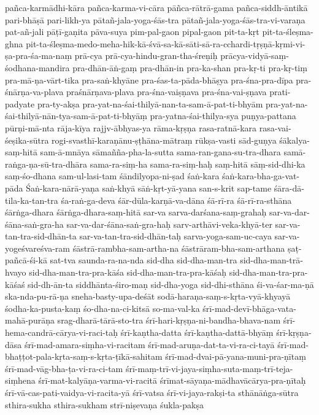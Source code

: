{{pañca-karmādhi-kāra
pañca-karma-vi-cāra
pāñca-rātrā-gama
pañca-siddh-āntikā
pari-bhāṣā
pari-likh-ya
pātañ-jala-yoga-śās-tra
pātañ-jala-yoga-śās-tra-vi-varaṇa
pat-añ-jali
pāṭī-gaṇita
pāva-suya
pim-pal-gaon
pipal-gaon
pit-ta-kṛt
pit-ta-śleṣma-ghna
pit-ta-śleṣma-medo-meha-hik-kā-śvā-sa-kā-sāti-sā-ra-cchardi-tṛṣṇā-kṛmi-vi-ṣa-pra-śa-ma-naṃ
prā-cya
prā-cya-hindu-gran-tha-śreṇiḥ
prācya-vidyā-saṃ-śodhana-mandira
pra-dhān-āṅ-gaṃ
pra-dhān-in
pra-ka-shan
pra-kṛ-ti
pra-kṛ-tiṃ
pra-mā-ṇa-vārt-tika
pra-saṅ-khyāne
pra-śas-ta-pāda-bhāṣya
pra-śna-pra-dīpa
pra-śnārṇa-va-plava
praśnārṇava-plava
pra-śna-vaiṣṇava
pra-śna-vai-ṣṇava
prati-padyate
pra-ty-akṣa
pra-yat-na-śai-thilyā-nan-ta-sam-ā-pat-ti-bhyām
pra-yat-na-śai-thilyā-nān-tya-sam-ā-pat-ti-bhyāṃ
pra-yatna-śai-thilya-sya
puṇya-pattana
pūrṇi-mā-nta
rāja-kīya
rajjv-ābhyas-ya
rāma-kṛṣṇa
rasa-ratnā-kara
rasa-vai-śeṣika-sūtra
rogi-svasthī-karaṇānu-ṣṭhāna-mātraṃ
rūkṣa-vasti
sād-guṇya
śākalya-saṃ-hitā
sam-ā-mnāya
sāmañña-pha-la-sutta
sama-ran-gana-su-tra-dhara
samā-raṅga-ṇa-sū-tra-dhāra
sama-ra-siṃ-ha
sama-ra-siṃ-haḥ
saṃ-hitā
sāṃ-sid-dhi-ka
saṃ-śo-dhana
sam-ul-lasi-tam
śāndilyopa-ni-ṣad
śaṅ-kara
śaṅ-kara-bha-ga-vat-pāda
Śaṅ-kara-nārā-yaṇa
saṅ-khyā
sāṅ-kṛt-yā-yana
san-s-krit
sap-tame
śāra-dā-tila-ka-tan-tra
śa-raṅ-ga-deva
śār-dūla-karṇā-va-dāna
śā-rī-ra
śā-rī-ra-sthāna
śārṅga-dhara
śārṅga-dhara-saṃ-hitā
sar-va
sarva-darśana-saṃ-grahaḥ
sar-va-dar-śāna-saṅ-gra-ha
sar-va-dar-śāna-saṅ-gra-haḥ
sarv-arthāvi-veka-khyā-ter
sar-va-tan-tra-sid-dhān-ta
sar-va-tan-tra-sid-dhān-taḥ
sarva-yoga-sam-uc-caya
sar-va-yogeśvareśva-ram
śāstrā-rambha-sam-artha-na
śāstrāram-bha-sam-arthana
ṣaṭ-pañcā-śi-kā
sat-tva
saunda-ra-na-nda
sid-dha
sid-dha-man-tra
sid-dha-man-trā-hvayo
sid-dha-man-tra-pra-kāśa
sid-dha-man-tra-pra-kāśaḥ
sid-dha-man-tra-pra-kāśaś
sid-dh-ān-ta
siddhānta-śiro-maṇ
sid-dha-yoga
sid-dhi-sthāna
śi-va-śar-ma-ṇā
ska-nda-pu-rā-ṇa
sneha-basty-upa-deśāt
sodā-haraṇa-saṃ-s-kṛta-vyā-khyayā
śodha-ka-pusta-kaṃ
śo-dha-na-ci-kitsā
so-ma-val-ka
śrī-mad-devī-bhāga-vata-mahā-purāṇa
srag-dharā-tārā-sto-tra
śrī-hari-kṛṣṇa-ni-bandha-bhava-nam
śrī-hema-candrā-cārya-vi-raci-taḥ
śrī-kaṇtha-datta
śrī-kaṇtha-dattā-bhyāṃ
śrī-kṛṣṇa-dāsa
śrī-mad-amara-siṃha-vi-racitam
śrī-mad-aruṇa-dat-ta-vi-ra-ci-tayā
śrī-mad-bhaṭṭot-pala-kṛta-saṃ-s-kṛta-ṭīkā-sahitam
śrī-mad-dvai-pā-yana-muni-pra-ṇītaṃ
śrī-mad-vāg-bha-ṭa-vi-ra-ci-tam
śrī-maṃ-trī-vi-jaya-siṃha-suta-maṃ-trī-teja-siṃhena
śrī-mat-kalyāṇa-varma-vi-racitā
śrīmat-sāyaṇa-mādhavācārya-pra-ṇītaḥ
śrī-vā-cas-pati-vaidya-vi-racita-yā
śrī-vatsa
śrī-vi-jaya-rakṣi-ta
sthānāṅga-sūtra
sthira-sukha
sthira-sukham
strī-niṣevaṇa
śukla-pakṣa
}}

